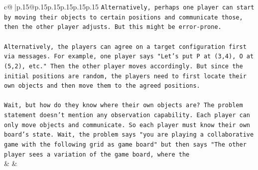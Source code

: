 \documentclass{article}
\begin{document}
{\begin{supertabular}{c@{$\;$}|p{.15\linewidth}@{}p{.15\linewidth}p{.15\linewidth}p{.15\linewidth}p{.15\linewidth}p{.15\linewidth}}
{{{\texttt{Alternatively, perhaps one player can start by moving their objects to certain positions and communicate those, then the other player adjusts. But this might be error{-}prone.} \\
\\ 
\texttt{Alternatively, the players can agree on a target configuration first via messages. For example, one player says "Let's put P at (3,4), O at (5,2), etc." Then the other player moves accordingly. But since the initial positions are random, the players need to first locate their own objects and then move them to the agreed positions.} \\
\\ 
\texttt{Wait, but how do they know where their own objects are? The problem statement doesn't mention any observation capability. Each player can only move objects and communicate. So each player must know their own board's state. Wait, the problem says "you are playing a collaborative game with the following grid as game board" but then says "The other player sees a variation of the game board, where the} \\
            }
        }
    }
    & & \\ \\


\end{supertabular}}
\end{document}
